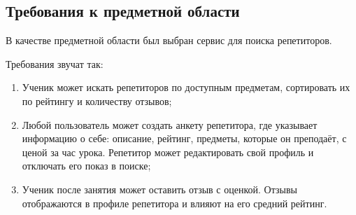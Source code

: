 \documentclass[a4paper, 14pt]{extarticle}
\begin{document}
\subsection{Требования к предметной области}\label{Sect::task}
В качестве предметной области был выбран сервис для поиска репетиторов.

Требования звучат так:

\begin{enumerate}
    \item Ученик может искать репетиторов по доступным предметам, сортировать их по рейтингу и количеству отзывов;
    \item Любой пользователь может создать анкету репетитора, где указывает информацию о себе: описание, рейтинг, предметы, которые он преподаёт, с ценой за час урока. Репетитор может редактировать свой профиль и отключать его показ в поиске;
    \item Ученик после занятия может оставить отзыв с оценкой. Отзывы отображаются в профиле репетитора и влияют на его средний рейтинг.
\end{enumerate}

\newpage
\end{document}
